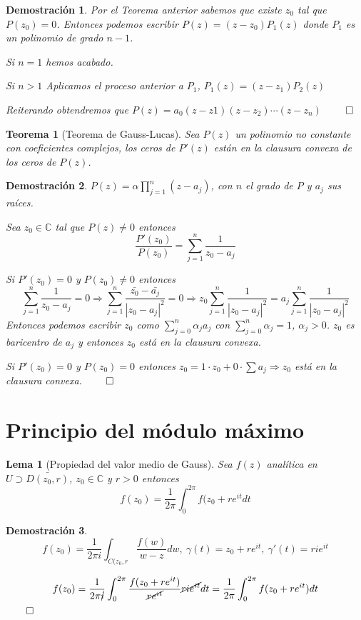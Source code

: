 \documentclass[12pt]{book}
\newtheorem{theorem}{Teorema}[chapter]
\newtheorem*{dem}{Demostración}
\newtheorem{lema}{Lema}[chapter]
\newcommand{\C}{\mathbb{C}}
\begin{document}
\begin{dem}
Por el Teorema anterior sabemos que existe $z_0$ tal que $P(z_0)=0$. Entonces podemos escribir $P(z) = (z-z_0)P_1(z)$ donde $P_1$ es un polinomio de grado $n-1$.

Si $n=1$ hemos acabado.

Si $n>1$ Aplicamos el proceso anterior a $P_1$, $P_1(z) = (z-z_1)P_2(z)$

Reiterando obtendremos que $P(z) = a_0(z-z1)(z-z_2)\cdots(z-z_n)$ 
$\qed$
\end{dem}


\begin{theorem}[Teorema de Gauss-Lucas]
Sea $P(z)$ un polinomio no constante con coeficientes complejos, los ceros de $P'(z)$ están en la clausura convexa de los ceros de $P(z)$.
\end{theorem}

\begin{dem}
$P(z)= \alpha \prod_{j=1}^n(z-a_j)$, con $n$ el grado de $P$ y $a_j$ sus raíces.

Sea $z_0\in\C$ tal que $P(z) \neq 0$ entonces 
$$\frac{P'(z_0)}{P(z_0)} = \sum_{j=1}^n \frac{1}{z_0-a_j}$$

Si $P'(z_0) = 0$  y $P(z_0)\neq 0$ entonces 
$$ \sum_{j=1}^n \frac{1}{z_0-a_j}=0 \Rightarrow \sum_{j=1}^n \frac{\bar{z_0}-\bar{a_j}}{|z_0-a_j|^2}=0 \Rightarrow z_0\sum_{j=1}^n \frac{1}{|z_0-a_j|^2} = a_j \sum_{j=1}^n \frac{1}{|z_0-a_j|^2}
$$
Entonces podemos escribir $z_0$ como $\sum_{j=0}^n \alpha_j a_j$ con $\sum_{j=0}^n \alpha_j = 1$, $\alpha_j >0$. $z_0$ es baricentro de $a_j$ y entonces $z_0$ está en la clausura convexa.

Si $P'(z_0) = 0$  y $P(z_0)= 0$ entonces $z_0 = 1\cdot z_0 + 0\cdot\sum a_j \Rightarrow z_0$ está en la clausura convexa. $\qed$
\end{dem}

\section{Principio del módulo máximo}

\begin{lema}[Propiedad del valor medio de Gauss]
Sea $f(z)$ analítica en $U\supset \bar{D(z_0,r)}$, $z_0\in\C$ y $r>0$ entonces
$$f(z_0) = \frac{1}{2\pi} \int_0^{2\pi} f(z_0+re^{it}dt$$
\end{lema}

\begin{dem}
$$f(z_0) = \frac{1}{2\pi i} \int_{C(z_0,r} \frac{f(w)}{w-z}dw,\ \gamma(t) = z_0+re^{it},\ \gamma'(t) = rie^{it}$$

$$
f(z_0) = \frac{1}{2\pi\cancel{i}}\int_0^{2\pi} \frac{f(z_0+re^{it})}{\cancel{r{e^{it}}}}\cancel{ri{e^{it}}}dt = \frac{1}{2\pi} \int_0^{2\pi} f(z_0+re^{it})dt
$$$\qed$
\end{dem}
\end{document}
